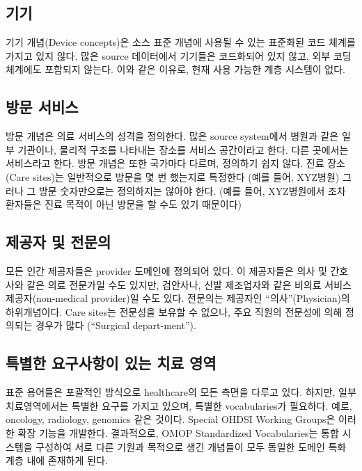 \documentclass[11pt]{book}
\theoremstyle{definition}
\theoremstyle{definition}
\theoremstyle{definition}
\theoremstyle{remark}
\begin{document}
\subsection{기기}

기기 개념(Device concepts)은 소스 표준 개념에 사용될 수 있는 표준화된
코드 체계를 가지고 있지 않다. 많은 source 데이터에서 기기들은 코드화되어
있지 않고, 외부 코딩 체계에도 포함되지 않는다. 이와 같은 이유로, 현재
사용 가능한 계층 시스템이 없다.

\subsection{방문 서비스}\label{-}

방문 개념은 의료 서비스의 성격을 정의한다. 많은 source system에서 병원과
같은 일부 기관이나, 물리적 구조를 나타내는 장소를 서비스 공간이라고
한다. 다른 곳에서는 서비스라고 한다. 방문 개념은 또한 국가마다 다르며,
정의하기 쉽지 않다. 진료 장소(Care sites)는 일반적으로 방문을 몇 번
했는지로 특정한다 (예를 들어, XYZ병원) 그러나 그 방문 숫자만으로는
정의하지는 않아야 한다. (예를 들어, XYZ병원에서 조차 환자들은 진료
목적이 아닌 방문을 할 수도 있기 때문이다)

\subsection{제공자 및 전문의}\label{--}

모든 인간 제공자들은 provider 도메인에 정의되어 있다. 이 제공자들은 의사
및 간호사와 같은 의료 전문가일 수도 있지만, 검안사나, 신발 제조업자와
같은 비의료 서비스 제공자(non-medical provider)일 수도 있다. 전문의는
제공자인 ``의사''(Physician)의 하위개념이다. Care sites는 전문성을
보유할 수 없으나, 주요 직원의 전문성에 의해 정의되는 경우가 많다
(``Surgical depart-ment'').

\subsection{특별한 요구사항이 있는 치료 영역}\label{----}

표준 용어들은 포괄적인 방식으로 healthcare의 모든 측면을 다루고 있다.
하지만, 일부 치료영역에서는 특별한 요구를 가지고 있으며, 특별한
vocabularies가 필요하다. 예로, oncology, radiology, genomics 같은
것이다. Special OHDSI Working Groups은 이러한 확장 기능을 개발한다.
결과적으로, OMOP Standardized Vocabularies는 통합 시스템을 구성하여 서로
다른 기원과 목적으로 생긴 개념들이 모두 동일한 도메인 특화 계층 내에
존재하게 된다.
\end{document}
